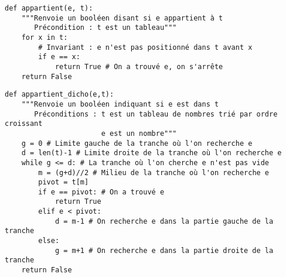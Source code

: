 \exer{}
\setcounter{numques}{0}


\begin{lstlisting}
def appartient(e, t):
    """Renvoie un booléen disant si e appartient à t
       Précondition : t est un tableau"""
    for x in t:
        # Invariant : e n'est pas positionné dans t avant x
        if e == x:
            return True # On a trouvé e, on s'arrête
    return False
\end{lstlisting}


\begin{lstlisting}
def appartient_dicho(e,t):
    """Renvoie un booléen indiquant si e est dans t
       Préconditions : t est un tableau de nombres trié par ordre croissant
                       e est un nombre"""
    g = 0 # Limite gauche de la tranche où l'on recherche e
    d = len(t)-1 # Limite droite de la tranche où l'on recherche e
    while g <= d: # La tranche où l'on cherche e n'est pas vide
        m = (g+d)//2 # Milieu de la tranche où l'on recherche e
        pivot = t[m] 
        if e == pivot: # On a trouvé e
            return True
        elif e < pivot: 
            d = m-1 # On recherche e dans la partie gauche de la tranche
        else:
            g = m+1 # On recherche e dans la partie droite de la tranche
    return False
\end{lstlisting}